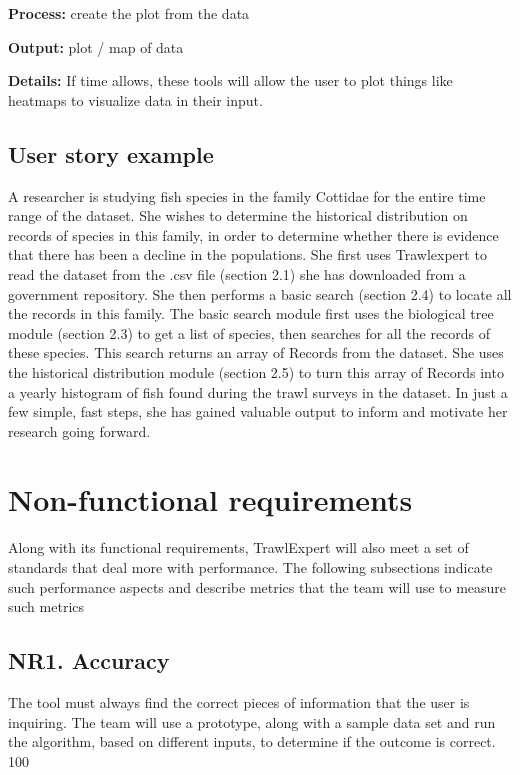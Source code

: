 \documentclass{article}
\begin{document}
\noindent \textbf{Process:} create the plot from the data

\noindent \textbf{Output:} plot / map of data

\noindent \textbf{Details:} If time allows, these tools will allow the user to plot things like heatmaps to visualize data in their input.

\subsection{User story example}
A researcher is studying fish species in the family Cottidae for the entire time range of the dataset. She wishes to determine the historical distribution on records of species in this family, in order to determine whether there is evidence that there has been a decline in the populations. 
She first uses Trawlexpert to read the dataset from the .csv file (section 2.1) she has downloaded from a government repository. She then performs a basic search (section 2.4) to locate all the records in this family. The basic search module first uses the biological tree module (section 2.3) to get a list of species, then searches for all the records of these species. This search returns an array of Records from the dataset. She uses the historical distribution module (section 2.5) to turn this array of Records into a yearly histogram of fish found during the trawl surveys in the dataset. In just a few simple, fast steps, she has gained valuable output to inform and motivate her research going forward.


\section{Non-functional requirements}
Along with its functional requirements, TrawlExpert will also meet a set of standards that deal more with performance. The following subsections indicate such performance aspects and describe metrics that the team will use to measure such metrics

\subsection{NR1. Accuracy}
The tool must always find the correct pieces of information that the user is inquiring. The team will use a prototype, along with a sample data set and run the algorithm, based on different inputs, to determine if the outcome is correct. 100%
\end{document}
